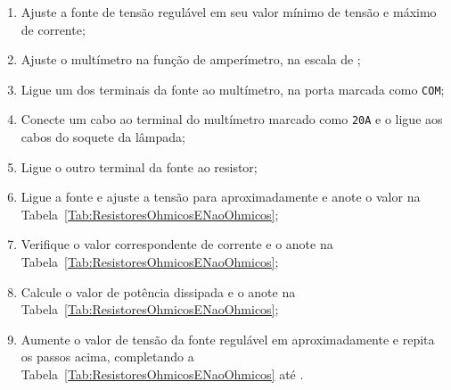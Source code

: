 \begin{enumerate}
	\item Ajuste a fonte de tensão regulável em seu valor mínimo de tensão e máximo de corrente; 
	\item Ajuste o multímetro na função de amperímetro, na escala de ;
	\item Ligue um dos terminais da fonte ao multímetro, na porta marcada como \texttt{COM};
	\item Conecte um cabo ao terminal do multímetro marcado como \texttt{20A} e o ligue aos cabos do soquete da lâmpada;
	\item Ligue o outro terminal da fonte ao resistor;
	\item Ligue a fonte e ajuste a tensão para aproximadamente  e anote o valor na Tabela~\ref{Tab:ResistoresOhmicosENaoOhmicos};
	\item Verifique o valor correspondente de corrente e o anote na Tabela~\ref{Tab:ResistoresOhmicosENaoOhmicos};
	\item Calcule o valor de potência dissipada e o anote na Tabela~\ref{Tab:ResistoresOhmicosENaoOhmicos};
	\item Aumente o valor de tensão da fonte regulável em aproximadamente  e repita os passos acima, completando a Tabela~\ref{Tab:ResistoresOhmicosENaoOhmicos} até . 
\end{enumerate}


\cleardoublepage


\vspace{15mm}

